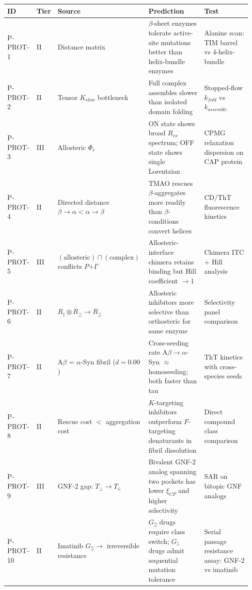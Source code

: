\documentclass[12pt,a4paper]{article}
\begin{document}
\begin{table}[htbp]
\centering
\small
{}
\begin{tabularx}{\textwidth}{>{\centering\arraybackslash}X >{\centering\arraybackslash}X >{\centering\arraybackslash}X >{\centering\arraybackslash}X >{\centering\arraybackslash}X}
\toprule
\rowcolor{gray!25}\textbf{ID} & \textbf{Tier} & \textbf{Source} & \textbf{Prediction} & \textbf{Test} \\
\midrule
\rowcolors{1}{white}{gray!10}
P-PROT-1 & II & Distance matrix & $\beta$-sheet enzymes tolerate active-site mutations better than helix-bundle enzymes & Alanine scan: TIM barrel vs 4-helix-bundle \\
P-PROT-2 & II & Tensor $K_{slow}$ bottleneck & Full complex assembles slower than isolated domain folding & Stopped-flow $k_{fold}$ vs $k_{assemble}$ \\
P-PROT-3 & III & Allosteric $\Phi_c$ & ON state shows broad $R_{ex}$ spectrum; OFF state shows single Lorentzian & CPMG relaxation dispersion on CAP protein \\
P-PROT-4 & II & Directed distance $\beta{\to}\alpha < \alpha{\to}\beta$ & TMAO rescues $\beta$-aggregates more readily than $\beta$-conditions convert helices & CD/ThT fluorescence kinetics \\
P-PROT-5 & III & $(\text{allosteric}) \sqcap (\text{complex})$ conflicts $P$+$\Gamma$ & Allosteric-interface chimera retains binding but Hill coefficient $\to 1$ & Chimera ITC + Hill analysis \\
P-PROT-6 & II & $R_\ddagger \otimes R_\supseteq \to R_\supseteq$ & Allosteric inhibitors more selective than orthosteric for same enzyme & Selectivity panel comparison \\
P-PROT-7 & II & A$\beta$ = $\alpha$-Syn fibril ($d = 0.00$) & Cross-seeding rate A$\beta{\to}\alpha$-Syn $\approx$ homoseeding; both faster than tau & ThT kinetics with cross-species seeds \\
P-PROT-8 & II & Rescue cost $<$ aggregation cost & $K$-targeting inhibitors outperform $F$-targeting denaturants in fibril dissolution & Direct compound class comparison \\
P-PROT-9 & III & GNF-2 gap: $T_\perp \to T_\in$ & Bivalent GNF-2 analog spanning two pockets has lower $\xi_{CP}$ and higher selectivity & SAR on bitopic GNF analogs \\
P-PROT-10 & II & Imatinib $G_\beth \to$ irreversible resistance & $G_\beth$ drugs require class switch; $G_\gimel$ drugs admit sequential mutation tolerance & Serial passage resistance assay: GNF-2 vs imatinib \\
\bottomrule
\end{tabularx}
\end{table}
\end{document}
